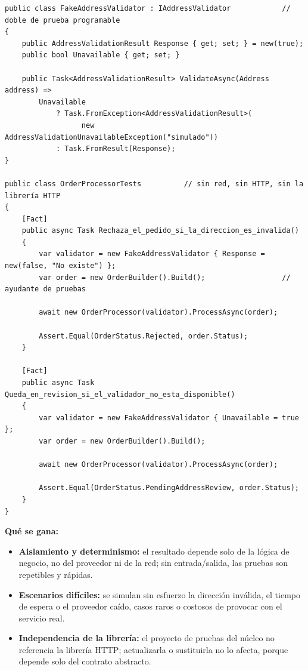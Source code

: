 \documentclass[11pt,a4paper]{article}
\begin{document}
\begin{lstlisting}[language={[Sharp]C}]
public class FakeAddressValidator : IAddressValidator            // doble de prueba programable
{
    public AddressValidationResult Response { get; set; } = new(true);
    public bool Unavailable { get; set; }

    public Task<AddressValidationResult> ValidateAsync(Address address) =>
        Unavailable
            ? Task.FromException<AddressValidationResult>(
                  new AddressValidationUnavailableException("simulado"))
            : Task.FromResult(Response);
}

public class OrderProcessorTests          // sin red, sin HTTP, sin la librería HTTP
{
    [Fact]
    public async Task Rechaza_el_pedido_si_la_direccion_es_invalida()
    {
        var validator = new FakeAddressValidator { Response = new(false, "No existe") };
        var order = new OrderBuilder().Build();                  // ayudante de pruebas

        await new OrderProcessor(validator).ProcessAsync(order);

        Assert.Equal(OrderStatus.Rejected, order.Status);
    }

    [Fact]
    public async Task Queda_en_revision_si_el_validador_no_esta_disponible()
    {
        var validator = new FakeAddressValidator { Unavailable = true };
        var order = new OrderBuilder().Build();

        await new OrderProcessor(validator).ProcessAsync(order);

        Assert.Equal(OrderStatus.PendingAddressReview, order.Status);
    }
}
\end{lstlisting}

\textbf{Qué se gana:}

\begin{itemize}[leftmargin=1.4em]
\item \textbf{Aislamiento y determinismo:} el resultado depende solo de la lógica de negocio,
no del proveedor ni de la red; sin entrada/salida, las pruebas son repetibles y rápidas.
\item \textbf{Escenarios difíciles:} se simulan sin esfuerzo la dirección inválida, el tiempo
de espera o el proveedor caído, casos raros o costosos de provocar con el servicio real.
\item \textbf{Independencia de la librería:} el proyecto de pruebas del núcleo no referencia la
librería HTTP; actualizarla o sustituirla no lo afecta, porque depende solo del contrato
abstracto.
\end{itemize}
\end{document}
